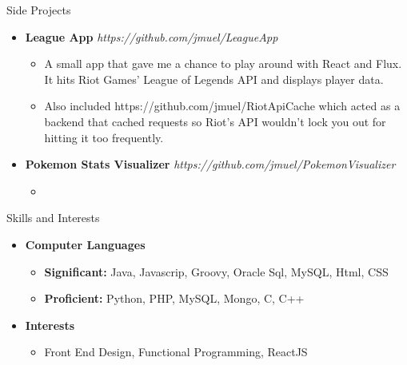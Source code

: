 \documentclass[11pt.oneside]{article}
\newenvironment{ressection}[1]{
    \vspace{4pt}
    {\fontfamily{phv}\selectfont\Large#1}
    \begin{itemize}
    \vspace{3pt} 
}{
    \end{itemize}
}
\newcommand{\resitem}[1]{
    \vspace{-4pt}
    \item \begin{flushleft}#1 \end{flushleft}
}
\newcommand{\ressubitem}[1]{
    \vspace{-1pt}
    \item \begin{flushleft}#1 \end{flushleft}
}
\newcommand{\resbigitem}[3]{
    \vspace{-5pt}
    \item
    \textbf{#1}  #2 
    \hfill
    \textit{#3}
}
\newenvironment{ressubsec}[3]{
    \resbigitem{#1}{#2}{#3}
    \vspace{-2pt}
    \begin{itemize} 
}{
    \end{itemize}
}
\newenvironment{reslist}[1]{
    \resitem{\textbf{#1}}
    \vspace{-5pt}
    \begin{itemize}
}{
    \end{itemize}
}
\begin{document}
\begin{ressection}{Side Projects}
  \begin{ressubsec}{League App}{}{https://github.com/jmuel/LeagueApp}
    \ressubitem{A small app that gave me a chance to play around with React and Flux. It hits Riot Games' League of Legends API and displays player data.}
    \ressubitem{Also included https://github.com/jmuel/RiotApiCache which acted as a backend that cached requests so Riot's API wouldn't lock you out for hitting it too frequently.}
  \end{ressubsec}
  \begin{ressubsec}{Pokemon Stats Visualizer}{}{https://github.com/jmuel/PokemonVisualizer}
    \ressubitem{}
  \end{ressubsec}
\end{ressection}

\begin{ressection}{Skills and Interests}
    \begin{reslist}{Computer Languages}
        \ressubitem{\textbf{Significant:} Java, Javascrip, Groovy, Oracle Sql, MySQL, Html, CSS}
        \ressubitem{\textbf{Proficient:} Python, PHP, MySQL, Mongo, C, C++}
    \end{reslist}
    \begin{reslist}{Interests}
        \ressubitem{Front End Design, Functional Programming, ReactJS}
    \end{reslist}
\end{ressection}
\end{document}
